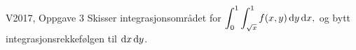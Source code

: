 \begin{frame}
  \begin{oppgave}{V2017, Oppgave 3}
    Skisser integrasjonsområdet for
    $\displaystyle
      \int_0^1 \int_{\sqrt{x}}^1 f(x,y) \mathop{}\! \mathrm{d} y\mathop{}\! \mathop{}\! \mathrm{d} x\mathop{}\!,
    $
    og bytt integrasjonsrekkefølgen til $\mathop{}\! \mathrm{d} x\mathop{}\! \mathop{}\! \mathrm{d} y\mathop{}\!$.
  \end{oppgave}
  \centerline{%
}
\end{frame}
